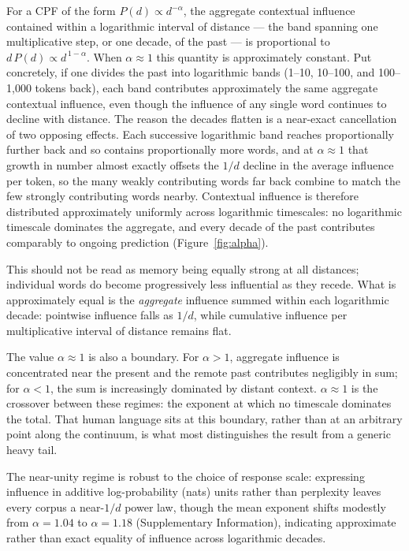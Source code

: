 \documentclass[11pt]{article}
\begin{document}
For a CPF of the form $P(d) \propto d^{-\alpha}$, the aggregate contextual influence contained
within a logarithmic interval of distance --- the band spanning one multiplicative step, or one
decade, of the past --- is proportional to $d\,P(d) \propto d^{\,1-\alpha}$. When $\alpha \approx 1$
this quantity is approximately constant. Put concretely, if one divides the past into logarithmic
bands (1--10, 10--100, and 100--1{,}000 tokens back), each band contributes approximately the
same aggregate contextual influence, even though the influence of any single word continues to
decline with distance. The reason the decades flatten is a near-exact cancellation of two opposing
effects. Each successive logarithmic band reaches proportionally further back and so contains
proportionally more words, and at $\alpha \approx 1$ that growth in number almost exactly offsets
the $1/d$ decline in the average influence per token, so the many weakly contributing words far
back combine to match the few strongly contributing words nearby. Contextual influence is therefore
distributed approximately uniformly across
logarithmic timescales: no logarithmic timescale dominates the aggregate, and every decade of the
past contributes comparably to ongoing prediction (Figure~\ref{fig:alpha}).

This should not be read as memory being equally strong at all distances; individual words do
become progressively less influential as they recede. What is approximately equal is the
\emph{aggregate} influence summed within each logarithmic decade: pointwise influence falls as
$1/d$, while cumulative influence per multiplicative interval of distance remains flat.

The value $\alpha \approx 1$ is also a boundary. For $\alpha > 1$, aggregate influence is
concentrated near the present and the remote past contributes negligibly in sum; for $\alpha < 1$,
the sum is increasingly dominated by distant context. $\alpha \approx 1$ is the crossover between
these regimes: the exponent at which no timescale dominates the total. That human language sits
at this boundary, rather than at an arbitrary point along the continuum, is what most distinguishes
the result from a generic heavy tail.

The near-unity regime is robust to the choice of response scale: expressing influence in additive
log-probability (nats) units rather than perplexity leaves every corpus a near-$1/d$ power law,
though the mean exponent shifts modestly from $\alpha=1.04$ to $\alpha=1.18$ (Supplementary
Information), indicating approximate rather than exact equality of influence across logarithmic
decades.
\end{document}
